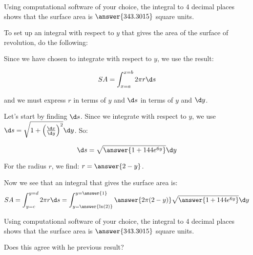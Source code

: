 \documentclass{ximera}
\begin{document}
\begin{exercise}
\begin{exercise}
\begin{exercise}
Using computational software of your choice, the integral to 4 decimal places shows that the surface area is $\answer{343.3015}$ square units.  
\end{exercise}
\end{exercise}



To set up an integral with respect to $y$ that gives the area of the surface of revolution, do the following:  

Since we have chosen to integrate with respect to $y$, we use the result:

\[ SA = \int_{x=a}^{x=b} 2 \pi r \d s\]

and we must express $r$ in terms of $y$ and $\d s$ in terms of $y$ and $\d y$.  


Let's start by finding $\d s$.  Since we integrate with respect to $y$, we use $\d s = \sqrt{1+\left(\frac{\d x}{\d y}\right)^2} \d y$. So: 

\[
\d s = \sqrt{\answer{1+144e^{6y}}} \d y
\]


\begin{exercise}
For the radius $r$, we find: $r=\answer{2-y}$.  


\begin{exercise}
Now we see that an integral that gives the surface area is: 
\[
SA= \int_{y=c}^{y=d} 2 \pi r \d s = \int_{y=\answer{\ln(2)}}^{y=\answer{1}} \answer{ 2\pi (2-y)} \sqrt{\answer{1+144e^{6y}}} \d y
\]

\begin{exercise}
Using computational software of your choice, the integral to 4 decimal places shows that the surface area is $\answer{343.3015}$ square units.  

Does this agree with he previous result?

\begin{multipleChoice}
\end{multipleChoice}

\end{exercise}



\end{exercise}
\end{exercise}
\end{exercise}
\end{document}
